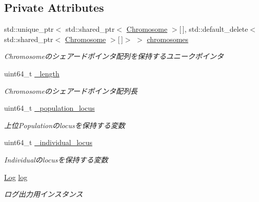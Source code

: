 \subsection*{Private Attributes}
\begin{DoxyCompactItemize}
\item 
\mbox{\label{class_g_a_1_1_individual_a183dbace348505f41e542030d25992ee}} 
std\+::unique\+\_\+ptr$<$ std\+::shared\+\_\+ptr$<$ \mbox{\hyperlink{class_g_a_1_1_chromosome}{Chromosome}} $>$\mbox{[}$\,$\mbox{]}, std\+::default\+\_\+delete$<$ std\+::shared\+\_\+ptr$<$ \mbox{\hyperlink{class_g_a_1_1_chromosome}{Chromosome}} $>$\mbox{[}$\,$\mbox{]}$>$ $>$ \mbox{\hyperlink{class_g_a_1_1_individual_a183dbace348505f41e542030d25992ee}{chromosomes}}
\begin{DoxyCompactList}\small\item\em Chromosomeのシェアードポインタ配列を保持するユニークポインタ \end{DoxyCompactList}\item 
\mbox{\label{class_g_a_1_1_individual_a699a3f9f0aefcd4c0503b8190223ddcb}} 
uint64\+\_\+t \mbox{\hyperlink{class_g_a_1_1_individual_a699a3f9f0aefcd4c0503b8190223ddcb}{\+\_\+length}}
\begin{DoxyCompactList}\small\item\em Chromosomeのシェアードポインタ配列長 \end{DoxyCompactList}\item 
\mbox{\label{class_g_a_1_1_individual_a00bf2a027858f02daec180eba5edf464}} 
uint64\+\_\+t \mbox{\hyperlink{class_g_a_1_1_individual_a00bf2a027858f02daec180eba5edf464}{\+\_\+population\+\_\+locus}}
\begin{DoxyCompactList}\small\item\em 上位\+Populationのlocusを保持する変数 \end{DoxyCompactList}\item 
\mbox{\label{class_g_a_1_1_individual_a8c5bddcd8de924efa1094651e095dbac}} 
uint64\+\_\+t \mbox{\hyperlink{class_g_a_1_1_individual_a8c5bddcd8de924efa1094651e095dbac}{\+\_\+individual\+\_\+locus}}
\begin{DoxyCompactList}\small\item\em Individualのlocusを保持する変数 \end{DoxyCompactList}\item 
\mbox{\label{class_g_a_1_1_individual_a0f9b85d7584e7edfce280fdec7abf616}} 
\mbox{\hyperlink{class_g_a_1_1_log}{Log}} \mbox{\hyperlink{class_g_a_1_1_individual_a0f9b85d7584e7edfce280fdec7abf616}{log}}
\begin{DoxyCompactList}\small\item\em ログ出力用インスタンス \end{DoxyCompactList}\end{DoxyCompactItemize}


